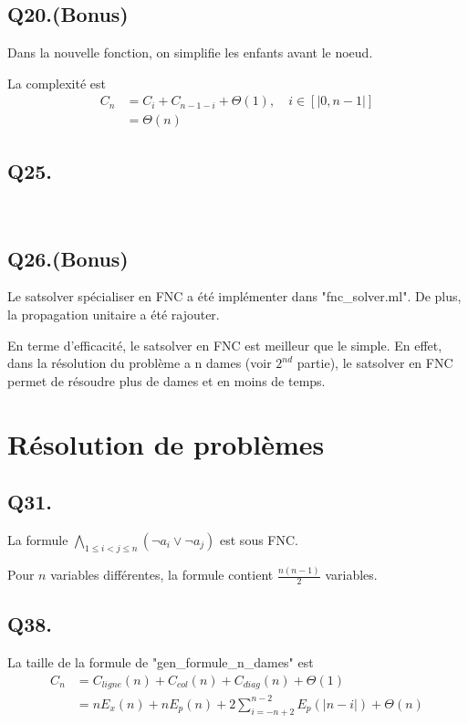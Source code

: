     \subsection*{Q20.(Bonus)}
    Dans la nouvelle fonction, on simplifie les enfants avant le noeud.
    
    La complexité est
    \begin{align*}
        C_n &= C_{i} + C_{n-1-i} + \Theta(1), \quad i \in [|0, n-1|]\\
        &= \Theta(n)
    \end{align*}
    
    \subsection*{Q25.}~
    
    \subsection*{Q26.(Bonus)}
    Le satsolver spécialiser en FNC a été implémenter dans "fnc\_solver.ml".
    De plus, la propagation unitaire a été rajouter.
    
    En terme d'efficacité, le satsolver en FNC est meilleur que le simple.
    En effet, dans la résolution du problème a n dames (voir $2^{nd}$ partie),
    le satsolver en FNC permet de résoudre plus de dames et en moins de temps.
    
    \section{Résolution de problèmes}
    \subsection*{Q31.}
    La formule $\bigwedge\limits_{1 \leq i < j \leq n}(\lnot a_i \vee \lnot a_j)$ est sous FNC.
    
    Pour $n$ variables différentes, la formule contient $\frac{n(n-1)}{2}$ variables.
    
    \subsection*{Q38.}
    La taille de la formule de "gen\_formule\_n\_dames" est
    \begin{align*}
        C_n &= C_{ligne}(n) + C_{col}(n) + C_{diag}(n) + \Theta(1)\\
        &= nE_x(n) + nE_p(n) + 2\sum_{i=-n+2}^{n-2}E_p(|n-i|) + \Theta(n)
    \end{align*}
    
